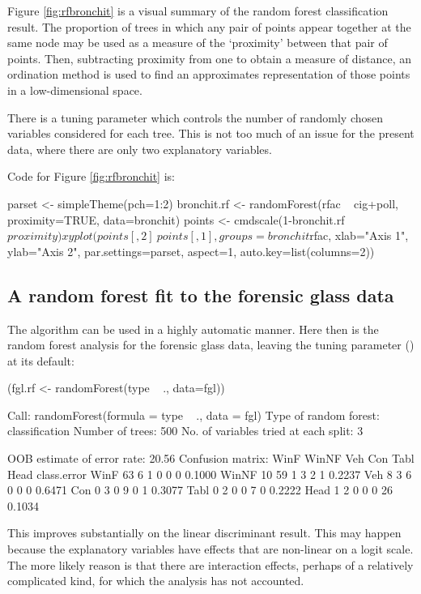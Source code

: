 Figure \ref{fig:rfbronchit} is a visual summary of the random forest
classification result.  The proportion of trees in which any pair of
points appear together at the same node may be used as a measure of
the `proximity' between that pair of points.  Then, subtracting
proximity from one to obtain a measure of distance, an ordination
method is used to find an approximates representation of those points in a
low-dimensional space.

There is a tuning parameter  which controls the number of
randomly chosen variables considered for each tree.  This is not too
much of an issue for the present data, where there are only two
explanatory variables.

Code for Figure \ref{fig:rfbronchit} is:
\begin{Schunk}
\begin{Sinput}
parset <- simpleTheme(pch=1:2)
bronchit.rf <- randomForest(rfac ~ cig+poll,
                            proximity=TRUE,
                            data=bronchit)
points <- cmdscale(1-bronchit.rf$proximity)
xyplot(points[,2] ~ points[,1],
       groups=bronchit$rfac,
       xlab="Axis 1", ylab="Axis 2",
       par.settings=parset, aspect=1,
       auto.key=list(columns=2))
\end{Sinput}
\end{Schunk}

\subsection*{A random forest fit to the forensic glass data}

The algorithm can be used in a highly automatic manner.  Here then is
the random forest analysis for the forensic glass data, leaving the
tuning parameter () at its default:
\begin{Schunk}
\begin{Sinput}
(fgl.rf <- randomForest(type ~ ., data=fgl))
\end{Sinput}
\begin{Soutput}

Call:
 randomForest(formula = type ~ ., data = fgl) 
               Type of random forest: classification
                     Number of trees: 500
No. of variables tried at each split: 3

        OOB estimate of  error rate: 20.56%
Confusion matrix:
      WinF WinNF Veh Con Tabl Head class.error
WinF    63     6   1   0    0    0      0.1000
WinNF   10    59   1   3    2    1      0.2237
Veh      8     3   6   0    0    0      0.6471
Con      0     3   0   9    0    1      0.3077
Tabl     0     2   0   0    7    0      0.2222
Head     1     2   0   0    0   26      0.1034
\end{Soutput}
\end{Schunk}
This improves substantially on the linear discriminant result.
This may happen because the explanatory variables have effects
that are non-linear on a logit scale.  The more likely reason
is that there are interaction effects, perhaps of a relatively
complicated kind, for which the  analysis has not
accounted.

